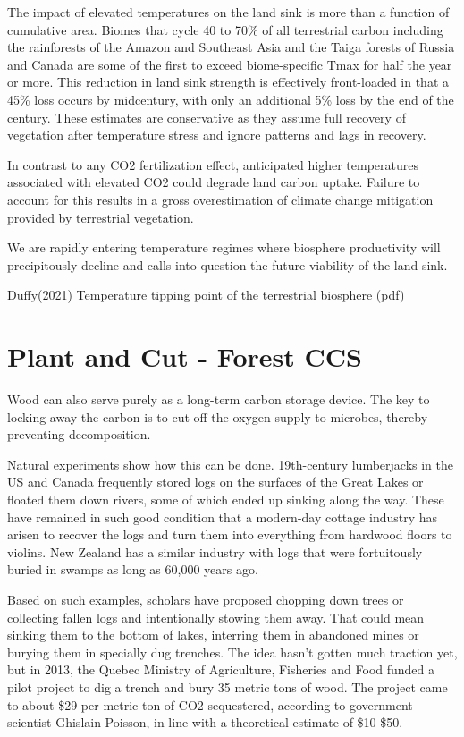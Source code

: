 \documentclass[
]{book}
\begin{document}
The impact of elevated temperatures on the land sink is more than a
function of cumulative area.
Biomes that cycle 40 to 70\% of all terrestrial carbon
including the rainforests of the Amazon and Southeast Asia and
the Taiga forests of Russia and Canada
are some of the first to exceed biome-specific Tmax
for half the year or more.
This reduction in land sink strength is effectively front-loaded
in that a 45\% loss occurs by midcentury,
with only an additional 5\% loss by the end of the century.
These estimates are conservative as they assume
full recovery of vegetation after temperature stress and
ignore patterns and lags in recovery.

In contrast to any CO2 fertilization effect,
anticipated higher temperatures associated with
elevated CO2 could degrade land carbon uptake.
Failure to account for this results in
a gross overestimation of climate change mitigation provided by terrestrial vegetation.

We are rapidly entering temperature regimes where biosphere productivity
will precipitously decline and
calls into question the future viability of the land sink.

\href{https://advances.sciencemag.org/content/7/3/eaay1052}{Duffy(2021) Temperature tipping point of the terrestrial biosphere}
\href{pdf/Duffy_2020_Temperature_Tipping_Point.pdf}{(pdf)}

\hypertarget{plant-and-cut---forest-ccs}{%
\section{Plant and Cut - Forest CCS}\label{plant-and-cut---forest-ccs}}

Wood can also serve purely as a long-term carbon storage device. The key to locking away the carbon is to cut off the oxygen supply to microbes, thereby preventing decomposition.

Natural experiments show how this can be done. 19th-century lumberjacks in the US and Canada frequently stored logs on the surfaces of the Great Lakes or floated them down rivers, some of which ended up sinking along the way. These have remained in such good condition that a modern-day cottage industry has arisen to recover the logs and turn them into everything from hardwood floors to violins. New Zealand has a similar industry with logs that were fortuitously buried in swamps as long as 60,000 years ago.

Based on such examples, scholars have proposed chopping down trees or collecting fallen logs and intentionally stowing them away. That could mean sinking them to the bottom of lakes, interring them in abandoned mines or burying them in specially dug trenches.
The idea hasn't gotten much traction yet, but in 2013, the Quebec Ministry of Agriculture, Fisheries and Food funded a pilot project to dig a trench and bury 35 metric tons of wood. The project came to about \$29 per metric ton of CO2 sequestered, according to government scientist Ghislain Poisson, in line with a theoretical estimate of \$10-\$50.
\end{document}
